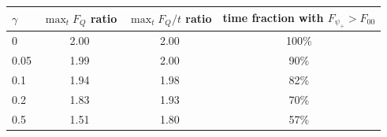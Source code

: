 \begin{tabular}{@{}lccc@{}}
\toprule
$\gamma$ & $\max_t F_Q$ ratio & $\max_t F_Q/t$ ratio & time fraction with $F_{\psi_+}>F_{00}$\\
\midrule
0 & 2.00 & 2.00 & 100\%\\
0.05 & 1.99 & 2.00 & 90\%\\
0.1 & 1.94 & 1.98 & 82\%\\
0.2 & 1.83 & 1.93 & 70\%\\
0.5 & 1.51 & 1.80 & 57\%\\
\bottomrule
\end{tabular}
